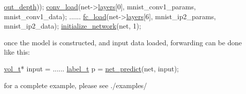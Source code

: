 \begin{DoxyCode}
      \hyperlink{structLayer_ad9871ba11cc56d38fdc754269d1dd551}{out\_depth}));
\hyperlink{convolutional__layer_8h_a7c2f2ea6b02d96d6324900844d4e535e}{conv\_load}(net->\hyperlink{structNetwork_a409fd1196f91871f40465bc914c8469d}{layers}[0], mnist\_conv1\_params, mnist\_conv1\_data);
......
\hyperlink{fully__connected__layer_8h_a4dbba49846ec688f51a7db35d3694a84}{fc\_load}(net->\hyperlink{structNetwork_a409fd1196f91871f40465bc914c8469d}{layers}[6], mnist\_ip2\_params, mnist\_ip2\_data);
\hyperlink{network_8h_a8156c41e6fa67372d63b81f603fb7415}{initialize\_network}(net, 1);
\end{DoxyCode}


once the model is constructed, and input data loaded, forwarding can be done like this\+: 
\begin{DoxyCode}
\hyperlink{structvol}{vol\_t}* input = ......
\hyperlink{layer_8h_a2b2a1226894e9f27b848908f83310852}{label\_t} p = \hyperlink{network_8h_a15497ca5a2b37846434a620cf9688bcf}{net\_predict}(net, input);
\end{DoxyCode}


for a complete example, please see ./examples/ 